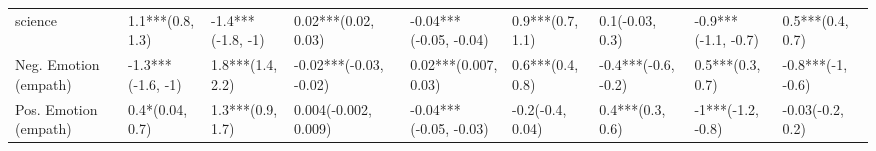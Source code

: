 \begin{tabular}{lllllllll}
science               &     1.1***(0.8, 1.3) &  -1.4***(-1.8, -1) &      0.02***(0.02, 0.03) &  -0.04***(-0.05, -0.04) &     0.9***(0.7, 1.1) &      0.1(-0.03, 0.3) &  -0.9***(-1.1, -0.7) &     0.5***(0.4, 0.7) \\
Neg. Emotion (empath) &    -1.3***(-1.6, -1) &   1.8***(1.4, 2.2) &   -0.02***(-0.03, -0.02) &    0.02***(0.007, 0.03) &     0.6***(0.4, 0.8) &  -0.4***(-0.6, -0.2) &     0.5***(0.3, 0.7) &    -0.8***(-1, -0.6) \\
Pos. Emotion (empath) &      0.4*(0.04, 0.7) &   1.3***(0.9, 1.7) &     0.004(-0.002, 0.009) &  -0.04***(-0.05, -0.03) &     -0.2(-0.4, 0.04) &     0.4***(0.3, 0.6) &    -1***(-1.2, -0.8) &     -0.03(-0.2, 0.2) \\
\bottomrule
\end{tabular}
